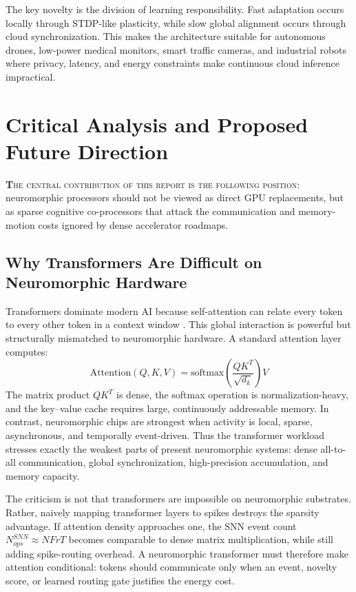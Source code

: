 \documentclass[11pt]{article}
\newcommand{\sectionlead}[2]{\noindent\lettrine[lines=2,lhang=0.08,nindent=0.12em]{\textcolor{IEEEblue}{\bfseries #1}}{\hspace{0.03em}#2}}
\begin{document}
The key novelty is the division of learning responsibility. Fast adaptation occurs locally through STDP-like plasticity, while slow global alignment occurs through cloud synchronization. This makes the architecture suitable for autonomous drones, low-power medical monitors, smart traffic cameras, and industrial robots where privacy, latency, and energy constraints make continuous cloud inference impractical.

\section{Critical Analysis and Proposed Future Direction}
\sectionlead{T}{he central contribution of this report is the following position}: neuromorphic processors should not be viewed as direct GPU replacements, but as sparse cognitive co-processors that attack the communication and memory-motion costs ignored by dense accelerator roadmaps.

\subsection{Why Transformers Are Difficult on Neuromorphic Hardware}
Transformers dominate modern AI because self-attention can relate every token to every other token in a context window \cite{vaswani2017attention}. This global interaction is powerful but structurally mismatched to neuromorphic hardware. A standard attention layer computes:
$$\text{Attention}(Q,K,V)=\text{softmax}\left(\frac{QK^T}{\sqrt{d_k}}\right)V$$
The matrix product $QK^T$ is dense, the softmax operation is normalization-heavy, and the key--value cache requires large, continuously addressable memory. In contrast, neuromorphic chips are strongest when activity is local, sparse, asynchronous, and temporally event-driven. Thus the transformer workload stresses exactly the weakest parts of present neuromorphic systems: dense all-to-all communication, global synchronization, high-precision accumulation, and memory capacity.

The criticism is not that transformers are impossible on neuromorphic substrates. Rather, naively mapping transformer layers to spikes destroys the sparsity advantage. If attention density approaches one, the SNN event count $N_{ops}^{SNN}\approx NFrT$ becomes comparable to dense matrix multiplication, while still adding spike-routing overhead. A neuromorphic transformer must therefore make attention conditional: tokens should communicate only when an event, novelty score, or learned routing gate justifies the energy cost.
\end{document}

